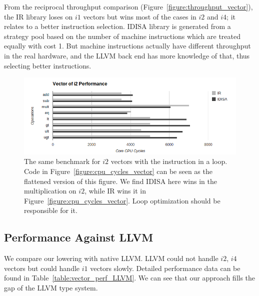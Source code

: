 From the reciprocal throughput comparison (Figure~\ref{figure:throughput_vector}), the IR library loses on $i1$ vectors but wins most of the cases in $i2$ and $i4$; it relates to a better instruction selection. IDISA library is generated from a strategy pool based on the number of machine instructions which are treated equally with cost 1. But machine instructions actually have different throughput in the real hardware, and the LLVM back end has more knowledge of that, thus selecting better instructions.

\begin{figure}[htbp!]
\centering
\includegraphics[width=140mm]{draw/loop_vector_i2.png}
\caption[Vector of $i2$ tested in a loop]{The same benchmark for $i2$ vectors with the instruction in a loop. Code in Figure~\ref{figure:cpu_cycles_vector} can be seen as the flattened version of this figure. We find IDISA here wins in the multiplication on $i2$, while IR wins it in Figure~\ref{figure:cpu_cycles_vector}. Loop optimization should be responsible for it.}
\label{figure:loop_vector_i2}
\end{figure}

\subsection{Performance Against LLVM}
We compare our lowering with native LLVM\@. LLVM could not handle $i2$, $i4$ vectors but could handle $i1$ vectors slowly. Detailed performance data can be found in Table~\ref{table:vector_perf_LLVM}. We can see that our approach fills the gap of the LLVM type system.

